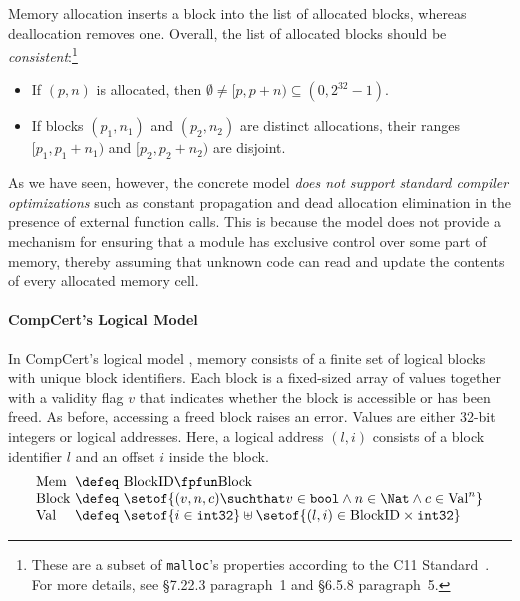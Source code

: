 Memory allocation inserts a block into the list of allocated blocks, 
whereas deallocation removes one.  Overall, the list of allocated 
blocks should be \emph{consistent}:\footnote{These are a subset of 
  \texttt{malloc}'s properties according to the C11 Standard~\cite{iso2011iec}. 
  For more details, see \S7.22.3 paragraph~1 and \S6.5.8 paragraph~5.}
\begin{itemize}
\item If $(p, n)$ is allocated, then $\emptyset \neq [p,p+n) \subseteq
  (0,2^{32}-1)$.
\item If blocks $(p_1, n_1)$ and $(p_2, n_2)$ are distinct
  allocations, their ranges $[p_1,p_1+n_1)$ and $[p_2,p_2+n_2)$
  are disjoint.
\end{itemize}

As we have seen, however, the concrete model \emph{does not support 
standard compiler optimizations} such as constant propagation and 
dead allocation elimination in the presence of external function
calls.  This is because the model does not provide 
a mechanism for ensuring that a module has exclusive control over some
part of memory, thereby assuming that unknown code can read and 
update the contents of every allocated memory cell.


\paragraph{CompCert's Logical Model}

In CompCert's logical model
\cite{leroy:compcert,Leroy-Appel-Blazy-Stewart-memory-v2}, memory
consists of a finite set of logical blocks with unique block
identifiers.  Each block is a fixed-sized array of values together
with a validity flag $v$ that indicates whether the block is accessible or
has been freed. As before, accessing a freed block raises an error.
Values are either 32-bit integers or logical addresses.  Here, a
logical address $(l,i)$ consists of a block identifier $l$ and an
offset $i$ inside the block.
\[
\begin{array}{@{}l@{~}c@{~}l@{}}
\mathrm{Mem} &\defeq& \mathrm{BlockID} \fpfun \mathrm{Block} \\
\mathrm{Block} &\defeq&
\setof{(v, n, c) \suchthat
  v \in \mathtt{bool} \land n \in \Nat \land c \in \mathrm{Val}^n } \\
\mathrm{Val} &\defeq& \setof{i\in\mathtt{int32}} \uplus \setof{(l,i) \in \mathrm{BlockID}\times \mathtt{int32}}
\end{array}
\]

